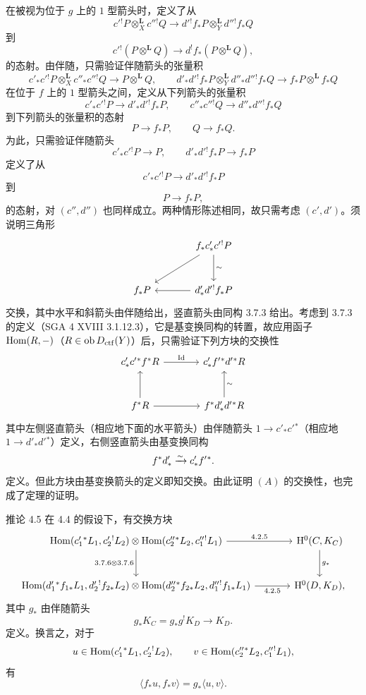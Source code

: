 \begin{prooftext}[证明]
\[\]
在被视为位于 $g$ 上的 $1$ 型箭头时，定义了从
\[
c'{}^!P\otimes_X^{\mathbf L}c''{}^!Q\longrightarrow d'{}^!f_*P\otimes_Y^{\mathbf L}d''{}^!f_*Q
\]
到
\[
c'{}^!(P\otimes^{\mathbf L}Q)\longrightarrow d^!f_*(P\otimes^{\mathbf L}Q),
\]
的态射。由伴随，只需验证伴随箭头的张量积
\[
c'_*c'{}^!P\otimes_X^{\mathbf L}c''_*c''{}^!Q\longrightarrow P\otimes^{\mathbf L}Q,
\qquad
d'_*d'{}^!f_*P\otimes_Y^{\mathbf L}d''_*d''{}^!f_*Q
\longrightarrow f_*P\otimes^{\mathbf L}f_*Q
\]
在位于 $f$ 上的 $1$ 型箭头之间，定义从下列箭头的张量积
\[
c'_*c'{}^!P\longrightarrow d'_*d'{}^!f_*P,\qquad
c''_*c''{}^!Q\longrightarrow d''_*d''{}^!f_*Q
\]
到下列箭头的张量积的态射
\[
P\longrightarrow f_*P,\qquad Q\longrightarrow f_*Q.
\]
为此，只需验证伴随箭头
\[
c'_*c'{}^!P\longrightarrow P,\qquad d'_*d'{}^!f_*P\longrightarrow f_*P
\]
定义了从
\[
c'_*c'{}^!P\longrightarrow d'_*d'{}^!f_*P
\]
到
\[
P\longrightarrow f_*P,
\]
的态射，对 $(c'',d'')$ 也同样成立。两种情形陈述相同，故只需考虑 $(c',d')$。须说明三角形
\[
\begin{tikzcd}[column sep=large,row sep=large]
& f_*c'_*c'{}^!P \arrow[d,"\sim"]\arrow[dl]\\
f_*P & d'_*d'{}^!f_*P\arrow[l]
\end{tikzcd}
\]
交换，其中水平和斜箭头由伴随给出，竖直箭头由同构 3.7.3 给出。考虑到 3.7.3 的定义（SGA 4 XVIII 3.1.12.3），它是基变换同构的转置，故应用函子 $\operatorname{Hom}(R,-)$（$R\in\operatorname{ob}D_{\mathrm{ctf}}(Y)$）后，只需验证下列方块的交换性
\[
\begin{tikzcd}[column sep=large,row sep=large]
c'_*c'{}^*f^*R \arrow[r,"\Id"] &
c'_*f'{}^*d'{}^*R\\
f^*R \arrow[u] \arrow[r] &
f^*d'_*d'{}^*R\arrow[u,"\sim"']
\end{tikzcd}
\]
其中左侧竖直箭头（相应地下面的水平箭头）由伴随箭头 $1\longrightarrow c'_*c'{}^*$（相应地 $1\longrightarrow d'_*d'{}^*$）定义，右侧竖直箭头由基变换同构
\[
f^*d'_*\xrightarrow{\sim} c'_*f'{}^*.
\]
定义。但此方块由基变换箭头的定义即知交换。由此证明 $(A)$ 的交换性，也完成了定理的证明。
\end{prooftext}

\begin{statement}{推论 4.5}
在 4.4 的假设下，有交换方块
\[
\begin{tikzcd}[column sep=large,row sep=large]
\Hom(c_1'{}^*L_1,c_2'{}^!L_2)\otimes
\Hom(c_2''{}^*L_2,c_1''{}^!L_1)
 \arrow[r,"4.2.5"] \arrow[d,"3.7.6\otimes 3.7.6"'] &
\H^0(C,K_C)\arrow[d,"g_*"]\\
\Hom(d_1'{}^*f_{1*}L_1,d_2'{}^!f_{2*}L_2)\otimes
\Hom(d_2''{}^*f_{2*}L_2,d_1''{}^!f_{1*}L_1)
 \arrow[r,"4.2.5"'] &
\H^0(D,K_D),
\end{tikzcd}
\]
其中 $g_*$ 由伴随箭头
\[
g_*K_C=g_*g^!K_D\longrightarrow K_D.
\]
定义。换言之，对于
\[
u\in\operatorname{Hom}(c_1'{}^*L_1,c_2'{}^!L_2),\qquad
v\in\operatorname{Hom}(c_2''{}^*L_2,c_1''{}^!L_1),
\]
有
\begin{equation}
\tag{4.5.1}
\langle f_*u,f_*v\rangle=g_*\langle u,v\rangle.
\end{equation}
\end{statement}

